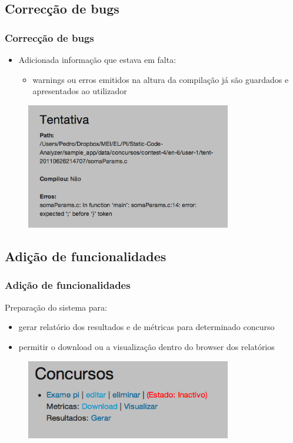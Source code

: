 \documentclass{beamer}
\begin{document}
\subsection{Correcção de bugs}
\begin{frame} \frametitle{Correcção de bugs}
\begin{itemize}
\item Adicionada informação que estava em falta:
	\begin{itemize}
	\item warnings ou erros emitidos na altura da compilação já são guardados e apresentados ao utilizador
	\end{itemize}
\end{itemize}

\begin{figure}[h]
\begin{center}
\includegraphics[width=0.8\textwidth]{imagens/erros.png}
\end{center}
\end{figure}

\end{frame}

\subsection{Adição de funcionalidades}
\begin{frame} \frametitle{Adição de funcionalidades}
Preparação do sistema para:
\begin{itemize}
\item gerar relatório dos resultados e de métricas para determinado concurso
\item permitir o download ou a visualização dentro do browser dos relatórios
\end{itemize}

\begin{figure}[h]
\begin{center}
\includegraphics[width=0.8\textwidth]{imagens/concurso.png}
\end{center}
\end{figure}

\end{frame}
\end{document}
